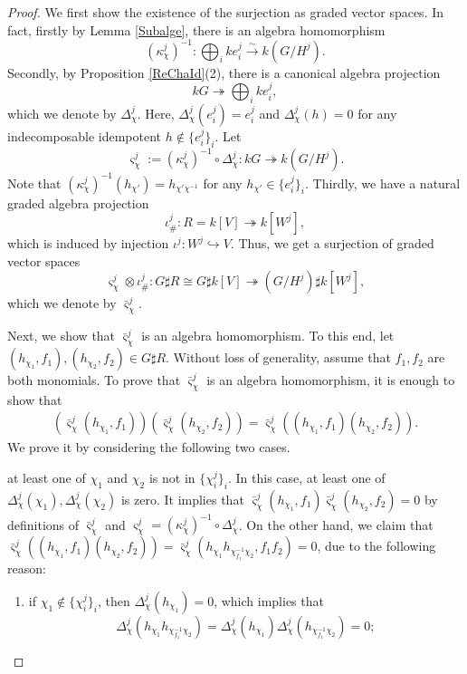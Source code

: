 \documentclass[11pt,reqno]{amsart}
\theoremstyle{definition}
\begin{document}
\begin{proof}
We first show the existence
of the surjection as graded vector 
spaces.
In fact, firstly by Lemma \ref{Subalge}, there is an algebra homomorphism 
$$
(\kappa^{j}_{\chi})^{-1}: \bigoplus_{i} ke_{i}^j  \xrightarrow{\sim} k(G / H^j).
$$
Secondly, 
by Proposition \ref{ReChaId}(2), 
there is
a canonical algebra projection 
$$
kG \twoheadrightarrow \bigoplus_{i} ke_{i}^j,
$$
which we denote by $\Delta^{j}_{\chi}$. Here, 
$\Delta^{j}_{\chi}(e_{i}^j) = e_{i}^j$ and $\Delta^{j}_{\chi}(h) = 0$ 
for any 
indecomposable idempotent 
$h \notin \{ e_{i}^j\}_i$. 
Let $$\varsigma^{j}_{\chi} :=  
(\kappa^{j}_{\chi})^{-1} \circ 
\Delta^{j}_{\chi}: k 
G\twoheadrightarrow
k(G/H^j).$$ 
Note that $(\kappa^{j}_{\chi})^{-1}
(h_{\chi'}) = h_{\chi' \chi^{-1}}$ 
for any 
$h_{\chi'} \in \{ e_i^j \}_i$.
Thirdly, 
we have a natural graded algebra  
projection 
$$
\iota^j_{\#}:
R = k[V] \twoheadrightarrow k[W^j],$$
which is induced by injection $\iota^j: W^j \hookrightarrow V$. 
Thus, we get a surjection of graded vector spaces 
$$
\varsigma^{j}_{\chi} \otimes \iota^j_{\#}: G \sharp R \cong G \sharp k[V]  
\twoheadrightarrow   (G / H^j) \sharp k[W^{j}],
$$
which we denote by $\bar{\varsigma}^{j}_{\chi}$.  

Next, we show that $\bar{\varsigma}^{j}_{\chi}$ is an algebra homomorphism. 
To this end,
let $(h_{\chi_1}, f_1), (h_{\chi_2}, f_2) \in G \sharp R$. 
Without loss of generality, assume 
that $f_1, f_2$ are both monomials. 
To prove that $\bar{\varsigma}^{j}_{\chi}$ is an algebra homomorphism, it is enough to show that 
\begin{align}\label{dncjw}
	(\bar{\varsigma}^{j}_{\chi}(h_{\chi_1}, f_1) 
    )(\bar{\varsigma}^{j}_{\chi}(h_{\chi_2}, f_2)) 
    = \bar{\varsigma}^{j}_{\chi} ((h_{\chi_1}, f_1) (h_{\chi_2}, f_2)).
\end{align}
We prove it by considering
the following two cases.

\vspace{2mm}
at least one of $\chi_1$ and $\chi_2$ is not in 
$\{\chi_i^j\}_i$. In this case, 
at least one of 
$\Delta^{j}_{\chi}(\chi_1), \Delta^{j}_{\chi}(\chi_2)$ is zero. It implies that 
$\bar{\varsigma}^{j}_{\chi}(h_{\chi_1}, f_1)\bar{\varsigma}^{j}_{\chi}(h_{\chi_2}, f_2) = 0  
$ by definitions of $\bar{\varsigma}^{j}_{\chi}$ and 
$\varsigma^{j}_{\chi} = (\kappa^{j}_{\chi})^{-1} \circ \Delta^{j}_{\chi}$. 
On the other hand, we claim that
$\bar{\varsigma}^{j}_{\chi} ((h_{\chi_1}, f_1) (h_{\chi_2}, f_2)) 
= \bar{\varsigma}^{j}_{\chi} (h_{\chi_1} h_{\chi^{-1}_{f_1} \chi_2}, f_1 f_2) =0$,
due to the following reason:
\begin{enumerate}
\item[(1)] if 
$\chi_1 \notin \{\chi_i^j\}_i$, then 
$\Delta^{j}_{\chi}(h_{\chi_1}) = 0$, which implies that 
$$\Delta^{j}_{\chi}(h_{\chi_1} h_{\chi^{-1}_{f_1} \chi_2}) = \Delta^{j}_{\chi}(h_{\chi_1}) 
\Delta^{j}_{\chi}(h_{\chi^{-1}_{f_1} \chi_2}) = 0;$$
	

\end{enumerate}
\end{proof}
\end{document}
